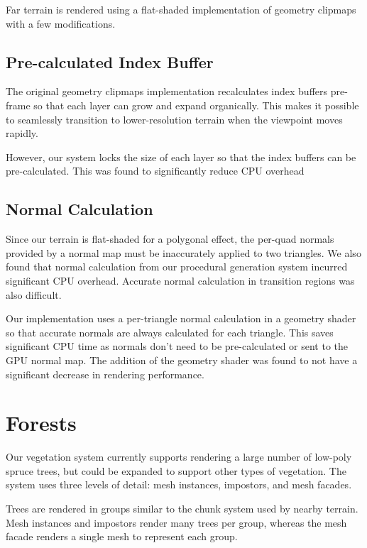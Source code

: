 Far terrain is rendered using a flat-shaded implementation of geometry clipmaps with a few modifications.

\subsection{Pre-calculated Index Buffer}

The original geometry clipmaps implementation recalculates index buffers pre-frame so that each layer can grow and expand organically.
This makes it possible to seamlessly transition to lower-resolution terrain when the viewpoint moves rapidly.

However, our system locks the size of each layer so that the index buffers can be pre-calculated.
This was found to significantly reduce CPU overhead

\subsection{Normal Calculation}

Since our terrain is flat-shaded for a polygonal effect, the per-quad normals provided by a normal map must be inaccurately applied to two triangles.
We also found that normal calculation from our procedural generation system incurred significant CPU overhead.
Accurate normal calculation in transition regions was also difficult.

Our implementation uses a per-triangle normal calculation in a geometry shader so that accurate normals are always calculated for each triangle.
This saves significant CPU time as normals don't need to be pre-calculated or sent to the GPU normal map.
The addition of the geometry shader was found to not have a significant decrease in rendering performance.


\section{Forests} \label{forests} %

Our vegetation system currently supports rendering a large number of low-poly spruce trees, but could be expanded to support other types of vegetation.
The system uses three levels of detail: mesh instances, impostors, and mesh facades.

Trees are rendered in groups similar to the chunk system used by nearby terrain.
Mesh instances and impostors render many trees per group, whereas the mesh facade renders a single mesh to represent each group.

